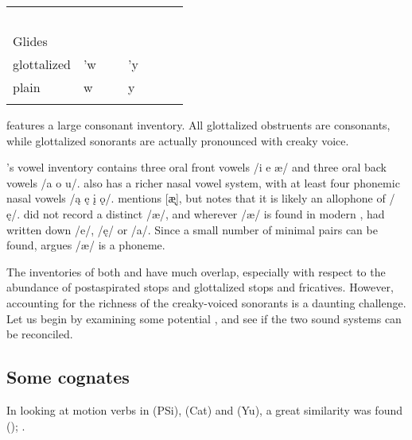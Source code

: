 \documentclass[output=paper]{LSP/langsci}
\begin{document}
\begin{table}[p]
\begin{tabular}{llllll}
~                           & ~                   & ~                    & ~                       & ~                   & ~                \\
  Glides           & ~                   & ~                    & ~                       & ~                   & ~                \\
 \midrule
glottalized                 & 'w                  & ~                    & 'y                      & ~                   & ~                \\
plain                       & w                   & ~                    & y                       & ~                   & ~                \\ \lspbottomrule
\end{tabular}
\end{table}

 features a large consonant inventory. All glottalized obstruents are  consonants, while glottalized sonorants are actually pronounced with creaky voice. 

's vowel inventory contains three oral front vowels /i e \ae/ and three oral back vowels /a o u/.  also has a richer nasal vowel system, with at least four phonemic nasal vowels /\k{a} \k{e} \k{i} \k{o}/. \citet{Linn2000} mentions [\k{\ae}], but notes that it is likely an allophone of /\k{e}/. \citet{Wagner1934} did not record a distinct /\ae/, and wherever /\ae/ is found in modern , \citet{Wagner1934} had written down /e/, /\k{e}/ or /a/. Since a small number of minimal pairs can be found, \citet[44]{Linn2000} argues /\ae/ is a phoneme.

The inventories of both  and  have much overlap, especially with respect to the abundance of postaspirated stops and glottalized stops and fricatives. However, accounting for the richness of the creaky-voiced sonorants is a daunting challenge. Let us begin by examining some potential , and see if the two sound systems can be reconciled.

\subsection{Some cognates}
 
In looking at motion verbs in  (PSi),  (Cat) and  (Yu), a great similarity was found (\citealt{Kasak2013}); .
\end{document}
